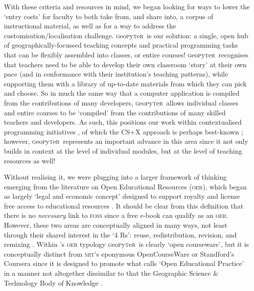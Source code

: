 \documentclass[letter, 11pt,titlepage]{article}
\newcommand{\gp}{\textsc{g}eo\textsc{p}y\textsc{t}e\textsc{r}~\/}
\newcommand{\eg}{e.g.~\/}
\begin{document}
With these criteria and resources in mind, we began looking for ways to lower the `entry costs' for faculty to both take from, and share into, a corpus of instructional material, as well as for a way to address the customisation/localisation challenge. \gp is our solution: a single, open hub of geographically-focussed teaching concepts and practical programming tasks that can be flexibly assembled into classes, or entire courses! \gp recognises that teachers need to be able to develop their own classroom `story' at their own pace (and in conformance with their institution's teaching patterns), while supporting them with a library of up-to-date materials from which they can pick and choose. So in much the same way that a computer application is compiled from the contributions of many developers, \gp allows individual classes and entire courses to be `compiled' from the contributions of many skilled teachers and developers. As such, this positions our work within contextualised programming initiatives \citep{Guzdial2010,Lukkarinen2016}, of which the CS+X approach is perhaps best-known \citep[\eg][]{Mir2017}; however, \gp represents an important advance in this area since it not only builds in context at the level of individual modules, but at the level of teaching resources as well!

Without realising it, we were plugging into a larger framework of thinking emerging from the literature on Open Educational Resources (\textsc{oer}), which began as largely `legal and economic concept' designed to support royalty and license free access to educational resources \citep{butcher2010open}. It should be clear from this definition that there is no \emph{necessary} link to \textsc{foss} since a free e-book can qualify as an \textsc{oer}. However, these two areas are conceptually aligned in many ways, not least through their shared interest in the `4 Rs': reuse, redistribution, revision, and remixing \citep{Hilton2010}. Within \citeauthor{du2017}'s \citeyearpar{du2017} \textsc{oer} typology \gp is clearly `open courseware', but it is conceptually distinct from \textsc{mit}'s eponymous OpenCourseWare or Standford's Coursera since it is designed to promote what \citeauthor{Ehlers2011} calls `Open Educational Practice' \citeyearpar{Ehlers2011} in a manner not altogether dissimilar to that the Geographic Science \& Technology Body of Knowledge \citep{bok2018}.
\end{document}
